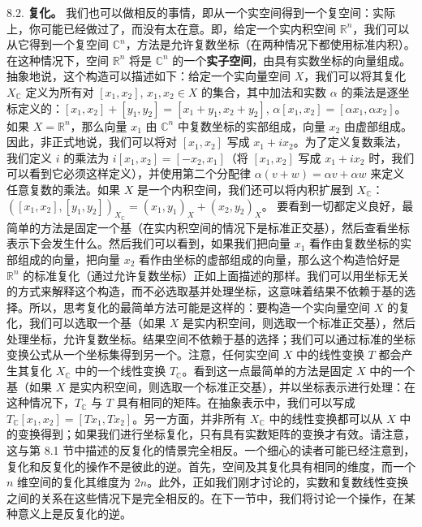 8.2. \textbf{复化。} 我们也可以做相反的事情，即从一个实空间得到一个复空间：实际上，你可能已经做过了，而没有太在意。即，给定一个实内积空间 $\mathbb{R}^n$，我们可以从它得到一个复空间 $\mathbb{C}^n$，方法是允许复数坐标（在两种情况下都使用标准内积）。在这种情况下，空间 $\mathbb{R}^n$ 将是 $\mathbb{C}^n$ 的一个\textbf{实子空间}，由具有实数坐标的向量组成。抽象地说，这个构造可以描述如下：给定一个实向量空间 $X$，我们可以将其复化 $X_{\mathbb{C}}$ 定义为所有对 $[x_1, x_2]$, $x_1, x_2 \in X$ 的集合，其中加法和实数 $\alpha$ 的乘法是逐坐标定义的：$[x_1, x_2] + [y_1, y_2] = [x_1 + y_1, x_2 + y_2]$, $\alpha [x_1, x_2] = [\alpha x_1, \alpha x_2]$。如果 $X = \mathbb{R}^n$，那么向量 $x_1$ 由 $\mathbb{C}^n$ 中复数坐标的实部组成，向量 $x_2$ 由虚部组成。因此，非正式地说，我们可以将对 $[x_1, x_2]$ 写成 $x_1 + ix_2$。为了定义复数乘法，我们定义 $i$ 的乘法为 $i[x_1, x_2] = [-x_2, x_1]$（将 $[x_1, x_2]$ 写成 $x_1 + ix_2$ 时，我们可以看到它必须这样定义），并使用第二个分配律 $\alpha(v+w) = \alpha v + \alpha w$ 来定义任意复数的乘法。如果 $X$ 是一个内积空间，我们还可以将内积扩展到 $X_{\mathbb{C}}$：
$([x_1, x_2], [y_1, y_2])_{X_{\mathbb{C}}} = (x_1, y_1)_X + (x_2, y_2)_X$。
要看到一切都定义良好，最简单的方法是固定一个基（在实内积空间的情况下是标准正交基），然后查看坐标表示下会发生什么。然后我们可以看到，如果我们把向量 $x_1$ 看作由复数坐标的实部组成的向量，把向量 $x_2$ 看作由坐标的虚部组成的向量，那么这个构造恰好是 $\mathbb{R}^n$ 的标准复化（通过允许复数坐标）正如上面描述的那样。我们可以用坐标无关的方式来解释这个构造，而不必选取基并处理坐标，这意味着结果不依赖于基的选择。所以，思考复化的最简单方法可能是这样的：要构造一个实向量空间 $X$ 的复化，我们可以选取一个基（如果 $X$ 是实内积空间，则选取一个标准正交基），然后处理坐标，允许复数坐标。结果空间不依赖于基的选择；我们可以通过标准的坐标变换公式从一个坐标集得到另一个。注意，任何实空间 $X$ 中的线性变换 $T$ 都会产生其复化 $X_{\mathbb{C}}$ 中的一个线性变换 $T_{\mathbb{C}}$。看到这一点最简单的方法是固定 $X$ 中的一个基（如果 $X$ 是实内积空间，则选取一个标准正交基），并以坐标表示进行处理：在这种情况下，$T_{\mathbb{C}}$ 与 $T$ 具有相同的矩阵。在抽象表示中，我们可以写成 $T_{\mathbb{C}}[x_1, x_2] = [Tx_1, Tx_2]$。另一方面，并非所有 $X_{\mathbb{C}}$ 中的线性变换都可以从 $X$ 中的变换得到；如果我们进行坐标复化，只有具有实数矩阵的变换才有效。请注意，这与第 8.1 节中描述的反复化的情景完全相反。一个细心的读者可能已经注意到，复化和反复化的操作不是彼此的逆。首先，空间及其复化具有相同的维度，而一个 $n$ 维空间的复化其维度为 $2n$。此外，正如我们刚才讨论的，实数和复数线性变换之间的关系在这些情况下是完全相反的。在下一节中，我们将讨论一个操作，在某种意义上是反复化的逆。

